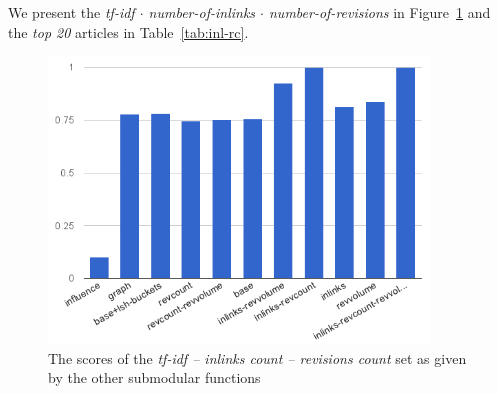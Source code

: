 We present the \emph{tf-idf \(\cdot\) number-of-inlinks \(\cdot\)
number-of-revisions} in Figure~\ref{img:inl-rc} and the \emph{top 20} articles
in Table~\ref{tab:inl-rc}.
\begin{figure}
  \centering
  \includegraphics[width=0.9\textwidth,natwidth=555,natheight=419]{images/inl-rc.png}
  \caption{The scores of the \emph{tf-idf -- inlinks count -- revisions count}
  set as given by the other submodular functions}
  \label{img:inl-rc}
\end{figure}

